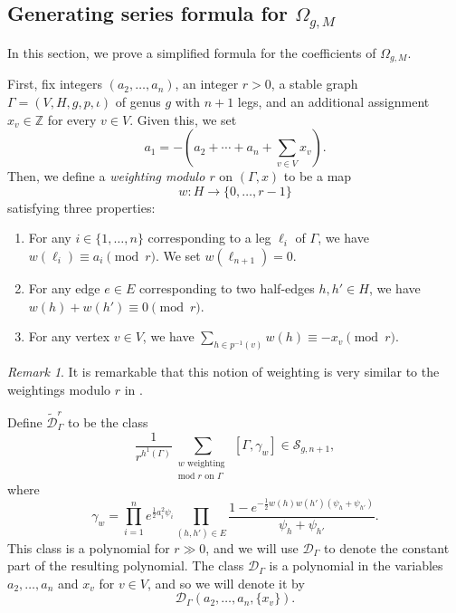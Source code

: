 \documentclass[12pt,reqno]{amsart}
\theoremstyle{plain}
\theoremstyle{definition}
\theoremstyle{remark}
\newtheorem{remark}[theorem]{Remark}
\begin{document}
\subsection{Generating series formula for $\Omega_{g, M}$}

In this section, we prove a simplified formula for the coefficients of
$\Omega_{g, M}$.

First, fix integers $(a_2, \dotsc, a_n)$, an integer $r > 0$, a
stable graph $\Gamma=(V,H,g,p,\iota)$ of genus $g$ with $n + 1$ legs, and  an additional assignment $x_v \in \mathbb Z$ for
every $v \in V$.
Given this, we set
\begin{equation*}
  a_1 = -(a_2 + \dotsb + a_n + \sum_{v \in V} x_v).
\end{equation*}
Then, we define a \emph{weighting modulo $r$} on $(\Gamma, x)$ to be a
map
\begin{equation*}
  w\colon H \to \{0, \dotsc, r - 1\}
\end{equation*}
satisfying three properties:
\begin{enumerate}
\item For any $i \in \{1, \dotsc, n\}$ corresponding to a leg $\ell_i$
  of $\Gamma$, we have $w(\ell_i) \equiv a_i \pmod{r}$.
  We set $w(\ell_{n + 1}) = 0$.
\item For any edge $e\in E$ corresponding to two half-edges $h, h'\in H$, we
  have $w(h) + w(h') \equiv 0 \pmod{r}$.
\item For any vertex $v \in V$, we have
  $\sum_{h\in p^{-1}(v)} w(h) \equiv -x_v \pmod{r}$.
\end{enumerate}
\begin{remark}
  It is remarkable that this notion of weighting is very similar to the weightings modulo $r$ in \cite[Definition~5]{bae2023pixton}.    
\end{remark}

Define $\widetilde{\mathcal{D}}_{\Gamma}^r$ to be the class
\begin{equation*}
  \frac 1{r^{h^1(\Gamma)}} \sum_{\substack{w \text{ weighting }\\ \text{mod } r \text{ on }\Gamma}} [\Gamma, \gamma_w] \in \mathcal{S}_{g,n + 1},
\end{equation*}
where
\begin{equation*}
  \gamma_w = \prod_{i=1}^n e^{\frac 12 a_i^2\psi_i} \prod_{(h,h')\in E} \frac{1 - e^{-\frac 12 w(h)w(h')(\psi_h + \psi_{h'})}}{\psi_h + \psi_{h'}}.
\end{equation*}
This class is a polynomial for $r \gg 0$, and we will use
$\mathcal{D}_{\Gamma}$ to denote the constant part of the resulting
polynomial.
The class $\mathcal{D}_{\Gamma}$ is a polynomial in the variables
$a_2, \dotsc, a_n$ and $x_v$ for $v \in V$, and so we will
denote it by
\begin{equation*}
  \mathcal{D}_{\Gamma}(a_2, \dotsc, a_n, \{x_v\}).
\end{equation*}
\end{document}
